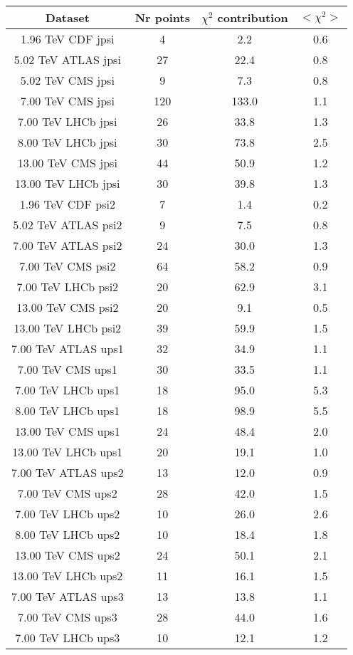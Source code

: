 \begin{table}[h!]
\centering
\begin{tabular}{c|c|c|c}
Dataset & Nr points & $\chi^2$ contribution & $<\chi^2>$ \\
\hline
1.96 TeV CDF jpsi & 4 & 2.2 & 0.6 \\
5.02 TeV ATLAS jpsi & 27 & 22.4 & 0.8 \\
5.02 TeV CMS jpsi & 9 & 7.3 & 0.8 \\
7.00 TeV CMS jpsi & 120 & 133.0 & 1.1 \\
7.00 TeV LHCb jpsi & 26 & 33.8 & 1.3 \\
8.00 TeV LHCb jpsi & 30 & 73.8 & 2.5 \\
13.00 TeV CMS jpsi & 44 & 50.9 & 1.2 \\
13.00 TeV LHCb jpsi & 30 & 39.8 & 1.3 \\
1.96 TeV CDF psi2 & 7 & 1.4 & 0.2 \\
5.02 TeV ATLAS psi2 & 9 & 7.5 & 0.8 \\
7.00 TeV ATLAS psi2 & 24 & 30.0 & 1.3 \\
7.00 TeV CMS psi2 & 64 & 58.2 & 0.9 \\
7.00 TeV LHCb psi2 & 20 & 62.9 & 3.1 \\
13.00 TeV CMS psi2 & 20 & 9.1 & 0.5 \\
13.00 TeV LHCb psi2 & 39 & 59.9 & 1.5 \\
7.00 TeV ATLAS ups1 & 32 & 34.9 & 1.1 \\
7.00 TeV CMS ups1 & 30 & 33.5 & 1.1 \\
7.00 TeV LHCb ups1 & 18 & 95.0 & 5.3 \\
8.00 TeV LHCb ups1 & 18 & 98.9 & 5.5 \\
13.00 TeV CMS ups1 & 24 & 48.4 & 2.0 \\
13.00 TeV LHCb ups1 & 20 & 19.1 & 1.0 \\
7.00 TeV ATLAS ups2 & 13 & 12.0 & 0.9 \\
7.00 TeV CMS ups2 & 28 & 42.0 & 1.5 \\
7.00 TeV LHCb ups2 & 10 & 26.0 & 2.6 \\
8.00 TeV LHCb ups2 & 10 & 18.4 & 1.8 \\
13.00 TeV CMS ups2 & 24 & 50.1 & 2.1 \\
13.00 TeV LHCb ups2 & 11 & 16.1 & 1.5 \\
7.00 TeV ATLAS ups3 & 13 & 13.8 & 1.1 \\
7.00 TeV CMS ups3 & 28 & 44.0 & 1.6 \\
7.00 TeV LHCb ups3 & 10 & 12.1 & 1.2 \\

\end{tabular}
\end{table}
